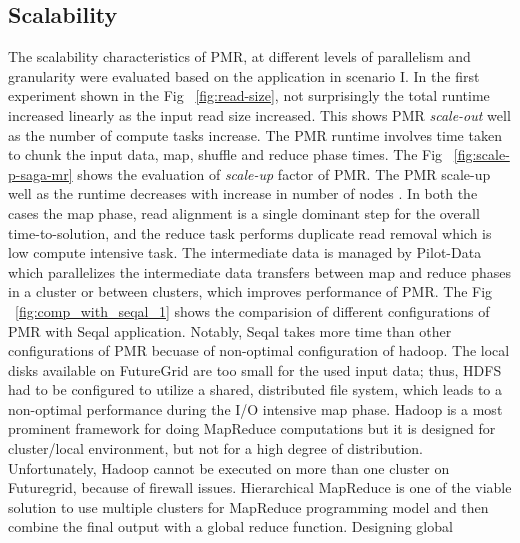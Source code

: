 \documentclass{acm_proc_article-sp}
\begin{document}
\subsection{Scalability}
The scalability characteristics of PMR, at different levels of parallelism and granularity were evaluated based on the application in scenario I.
In the first experiment shown in the  Fig ~\ref{fig:read-size}, not surprisingly the total runtime increased linearly as the input read size increased. 
This shows PMR \textit{scale-out} well as the number of  compute tasks increase. The PMR runtime involves time taken 
to chunk the input data, map, shuffle and reduce phase times.  The Fig ~\ref{fig:scale-p-saga-mr} shows the evaluation of \textit{scale-up} factor of PMR. 
The PMR scale-up well as the runtime decreases with increase in number of nodes .
In both the cases the map phase, read alignment is a single dominant step for the overall time-to-solution, and the reduce task performs duplicate read removal 
which is low compute intensive task. The intermediate data is managed by Pilot-Data which parallelizes the intermediate data transfers between 
map and reduce phases in a cluster or between clusters, which improves performance of PMR.
The Fig ~\ref{fig:comp_with_seqal_1} shows the comparision of different configurations of PMR with Seqal application. 
Notably, Seqal takes more time than other configurations of PMR becuase of non-optimal configuration of hadoop. 
The local disks available on FutureGrid are too small for the used input data;  thus, HDFS had to be configured to utilize a shared, distributed file system, 
which leads to a non-optimal performance during the I/O intensive map phase. Hadoop is a most prominent framework for doing MapReduce computations but it is designed for
cluster/local environment, but not for a high degree of distribution. Unfortunately, Hadoop cannot be executed on more than one cluster on Futuregrid, because of firewall issues. 
Hierarchical MapReduce is one of the viable solution to use multiple clusters for  MapReduce programming model and then combine the final output with a global reduce function. Designing global
\end{document}
